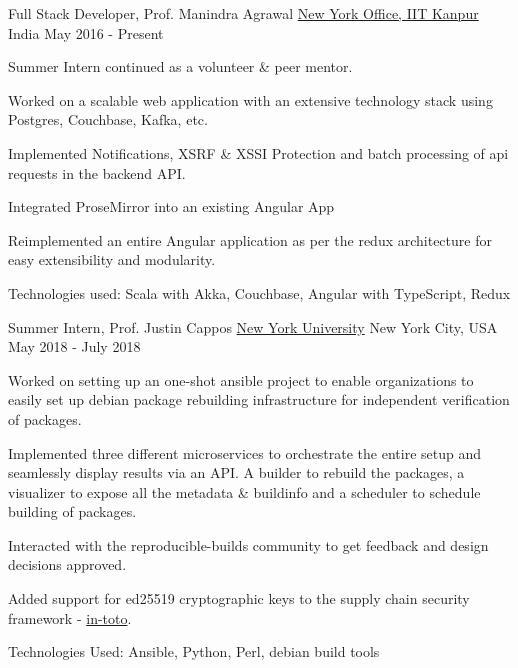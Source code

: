 \begin{cventries}

  \cventry
  {Full Stack Developer, Prof. Manindra Agrawal}
  {\href{https://yashsriv.org/2016/10/thoughts.html}{New York Office, IIT Kanpur}}
  {India}
  {May 2016 - Present}
  {
    \begin{cvitems}
      \item Summer Intern continued as a volunteer \& peer mentor.
      \item Worked on a scalable web application with an extensive technology
        stack using Postgres, Couchbase, Kafka, etc.
      \item	Implemented Notifications, XSRF \& XSSI Protection and batch
        processing of api requests in the backend API.
      \item Integrated ProseMirror into an existing Angular App
      \item Reimplemented an entire Angular application as per the redux
        architecture for easy extensibility and modularity.
        \ifdefined \ONEPAGE \else
      \item Technologies used: Scala with Akka, Couchbase, Angular with TypeScript, Redux
        \fi
    \end{cvitems}
  }

  \cventry
  {Summer Intern, Prof. Justin Cappos}
  {\href{https://yashsriv.org/2018/07/nyu.html}{New York University}}
  {New York City, USA}
  {May 2018 - July 2018}
  {
    \begin{cvitems}
      \item Worked on setting up an one-shot ansible project to enable
        organizations to easily set up debian package rebuilding infrastructure
        for independent verification of packages.
      \item Implemented three different microservices to orchestrate the entire
        setup and seamlessly display results via an API.
    \ifdefined\ONEPAGE
    \else
        A builder to rebuild the packages, a visualizer to expose all the
        metadata \& buildinfo and a scheduler to schedule building of packages.
        \fi
      \item Interacted with the reproducible-builds community to get feedback
        and design decisions approved.
      \item Added support for ed25519 cryptographic keys to the supply chain security
        framework - \href{https://in-toto.io/}{in-toto}.
        \ifdefined \ONEPAGE \else
      \item Technologies Used: Ansible, Python, Perl, debian build tools
        \fi
    \end{cvitems}
  }


\end{cventries}
